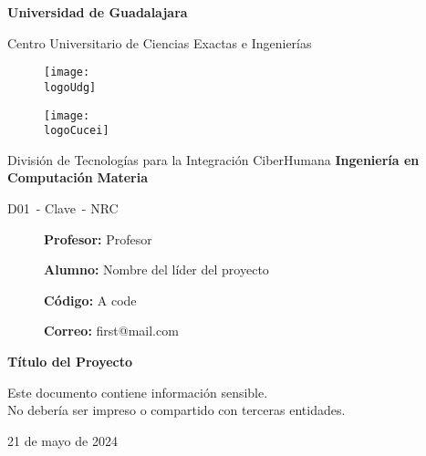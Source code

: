 \documentclass[10pt, a4paper]{article} %
\date{}
\title{\fontsize{24}{28.8}\selectfont \theTitle}
\author{\theAuthor}
\affil{}
\makeatletter
\newcommand{\logoUdg}{logo-udg.jpg}
\newcommand{\logoCucei}{logo-cucei.jpg}
\newcommand{\universidad}{Universidad de Guadalajara}
\newcommand{\cede}{Centro Universitario de Ciencias Exactas e Ingenierías}
\newcommand{\materia}{Materia}
\newcommand{\carrera}{Ingeniería en Computación}
\newcommand{\division}{División de Tecnologías para la Integración CiberHumana}
\newcommand{\theTitle}{Título del Proyecto}
\newcommand{\profesor}{Profesor}
\newcommand{\seccion}{D01}
\newcommand{\nrc}{NRC}
\newcommand{\clave}{Clave}
\newcommand{\startDate}{21 de mayo de 2024}
\newcommand{\theAuthor}{Nombre del líder del proyecto}
\newcommand{\theAuthorCode}{A code}
\newcommand{\theAuthorMail}{first@mail.com}
\newcommand{\nl}{\par\vspace{0.4cm}}
\makeatother
\begin{document}

\begin{titlepage}
	\centering
	{\huge\textbf{\universidad}}\par\vspace{0.6cm}
	{\LARGE{\cede}}\vfill

	\begin{figure}[h]
		\begin{minipage}[t]{0.45\textwidth}
			\centering
			\texttt{[image: \\logoUdg]}
		\end{minipage}
		\hfill
		\begin{minipage}[t]{0.45\textwidth}
			\centering
			\texttt{[image: \\logoCucei]}
		\end{minipage}
	\end{figure}\vfill


	\Large{
		\division\vfill
		\textbf{\carrera}\vfill
		\textbf{\materia}\par\vspace{3pt}
		\seccion\ - \clave\ - \nrc\vfill
	}

	\begin{figure}[h]
		\centering
		\begin{minipage}[t]{0.75\textwidth}
			{\Large
				\textbf{Profesor:} \profesor\nl
				\textbf{Alumno:} \theAuthor\nl
				\textbf{Código:} \theAuthorCode\nl
				\textbf{Correo:} \theAuthorMail
			}
		\end{minipage}
	\end{figure}\vfill

	{\LARGE{\textbf{\theTitle}}}\vfill
	
	\begin{tcolorbox}[colback=red!5!white, colframe=red!75!black]
		\centering
		Este documento contiene información sensible.\\
		No debería ser impreso o compartido con terceras entidades.
	\end{tcolorbox}\vfill
	{\large \startDate}\par
\end{titlepage}

\restoregeometry %

\clearpage
\tableofcontents

\clearpage
\listoffigures

\clearpage
\listoftables
\end{document}
